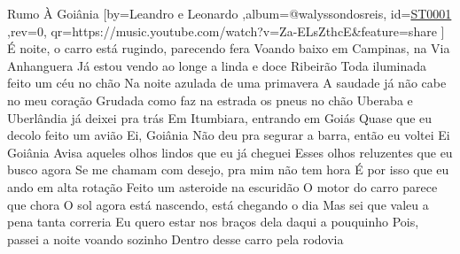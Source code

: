 \beginsong
{Rumo À Goiânia %
}[by={Leandro e Leonardo %
},album={@walyssondosreis},
id={\href{https://music.youtube.com/watch?v=Za-ELsZthcE&feature=share %
}{ST0001 %
}},rev={0}, %
qr={https://music.youtube.com/watch?v=Za-ELsZthcE&feature=share %
}]
\beginverse
É noite, o carro está rugindo, parecendo fera
Voando baixo em Campinas, na Via Anhanguera
Já estou vendo ao longe a linda e doce Ribeirão
Toda iluminada feito um céu no chão
Na noite azulada de uma primavera
\endverse
\beginverse
A saudade já não cabe no meu coração
Grudada como faz na estrada os pneus no chão
Uberaba e Uberlândia já deixei pra trás
Em Itumbiara, entrando em Goiás
Quase que eu decolo feito um avião
\endverse
\beginchorus
Ei, Goiânia
Não deu pra segurar a barra, então eu voltei
Ei Goiânia
Avisa aqueles olhos lindos que eu já cheguei
\endchorus
\beginverse
Esses olhos reluzentes que eu busco agora
Se me chamam com desejo, pra mim não tem hora
É por isso que eu ando em alta rotação
Feito um asteroide na escuridão
O motor do carro parece que chora
\endverse
\beginverse
O sol agora está nascendo, está chegando o dia
Mas sei que valeu a pena tanta correria
Eu quero estar nos braços dela daqui a pouquinho
Pois, passei a noite voando sozinho
Dentro desse carro pela rodovia
\endverse

